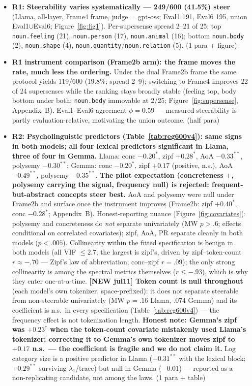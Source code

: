 \documentclass[11pt]{article}
\newenvironment{outline}{\color{gray!70!black}\begin{itemize}[leftmargin=1.2em,itemsep=1pt]}{\end{itemize}\color{black}}
\begin{document}
\begin{outline}
\item \textbf{R1: Steerability varies systematically --- 249/600 (41.5\%) steer} (Llama, all-layer, Frame4 frame, judge = gpt-oss; Eval1 191, Eval6 195, union Eval1$\cup$Eval6; Figure~\ref{fig:fig1}). Per-supersense spread 2--21 of 25: top \texttt{noun.feeling} (21), \texttt{noun.person} (17), \texttt{noun.animal} (16); bottom \texttt{noun.body} (2), \texttt{noun.shape} (4), \texttt{noun.quantity}/\texttt{noun.relation} (5). (1 para + figure)
\item \textbf{R1 instrument comparison (Frame2b arm): the frame moves the rate, much less the ordering.} Under the dual Frame2b frame the same protocol yields 119/600 (19.8\%; spread 2--9); switching to Frame4 improves 22 of 24 supersenses while the ranking stays broadly stable (feeling top, body bottom under both; \texttt{noun.body} immovable at 2/25; Figure~\ref{fig:supersense}, Appendix~B). Eval1--Eval6 agreement $\phi = 0.59$ --- measured steerability is partly evaluation-relative, motivating the union outcome. (half para)
\item \textbf{R2: Psycholinguistic predictors (Table~\ref{tab:reg600v4}): same signs in both models; all four lexical predictors significant in Llama, three of four in Gemma.} Llama: conc $-0.20^{*}$, zipf $+0.28^{*}$, AoA $-0.33^{**}$, polysemy $-0.30^{**}$; Gemma: conc $-0.20^{*}$, zipf $+0.17$ (positive, n.s.), AoA $-0.49^{**}$, polysemy $-0.35^{**}$. \textbf{The pilot expectation (concreteness $+$, polysemy carrying the signal, frequency null) is rejected: frequent-but-abstract concepts steer best.} AoA and polysemy were null under Frame2b and surface once the instrument improves (Frame2b: zipf $+0.40^{*}$, conc $-0.28^{*}$; Appendix~B). Honest-reporting nuance (Figure~\ref{fig:covariates}): polysemy and concreteness do \emph{not} separate univariately (MW $p{>}.6$; effects conditional on correlated covariates); zipf, AoA, PR separate cleanly in both models ($p{<}.005$). Collinearity within the fitted specification is benign in both models (all VIF $\le 2.7$; the largest is zipf's, driven by zipf--token-count $r{\approx}-.70$ --- Zipf's law of abbreviation; conc--zipf $r{=}.09$); the only strong collinearity is among the spectral metrics themselves ($r{\le}-.93$), which is why they enter one-at-a-time. \textbf{[NEW jul11] Token count is null throughout} (each model's own tokenizer, space-prefixed): it does not separate steerable from non-steerable univariately (MW $p{=}.16$ Llama, $.074$ Gemma) and its coefficient is n.s.\ in every specification (Table~\ref{tab:reg600v4}) --- the frequency effect is not tokenization length. \textbf{Honest note: Gemma's zipf was $+0.23^{\dagger}$ when the token-count covariate mistakenly used Llama's tokenizer; correcting it to Gemma's own tokenizer moves zipf to $+0.17$ n.s.\ --- the coefficient is fragile and we do not claim it.} Log category size is a positive predictor in Llama ($+0.31^{**}$ with the lexical block; $+0.29^{**}$ surviving $\lambda_1$/trace) but null in Gemma ($-0.01$) --- reported as a non-replicating candidate, not among the laws. (1 para + table)

\end{outline}
\end{document}

